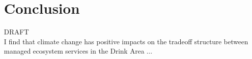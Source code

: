\section{Conclusion}
\label{sec:conclusion}

DRAFT\\
I find that climate change has positive impacts on the tradeoff structure between managed ecosystem services in the Drink Area $\ldots$